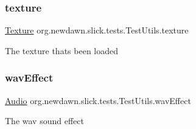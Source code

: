 \subsubsection{\texorpdfstring{texture}{texture}}
{\footnotesize\ttfamily \mbox{\hyperlink{interfaceorg_1_1newdawn_1_1slick_1_1opengl_1_1_texture}{Texture}} org.\+newdawn.\+slick.\+tests.\+Test\+Utils.\+texture\hspace{0.3cm}{\ttfamily [private]}}

The texture that\textquotesingle{}s been loaded \mbox{\label{classorg_1_1newdawn_1_1slick_1_1tests_1_1_test_utils_a1b40069da828fdd5131e127a1db4e1f3}} 
\subsubsection{\texorpdfstring{wav\+Effect}{wavEffect}}
{\footnotesize\ttfamily \mbox{\hyperlink{interfaceorg_1_1newdawn_1_1slick_1_1openal_1_1_audio}{Audio}} org.\+newdawn.\+slick.\+tests.\+Test\+Utils.\+wav\+Effect\hspace{0.3cm}{\ttfamily [private]}}

The wav sound effect 